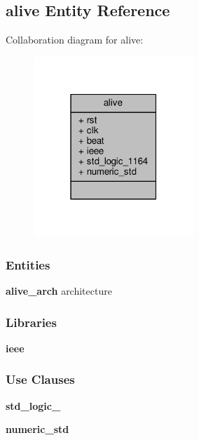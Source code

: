 \subsection{alive Entity Reference}
\label{classalive}


Collaboration diagram for alive\+:\nopagebreak
\begin{figure}[H]
\begin{center}
\leavevmode
\includegraphics[width=171pt]{da/d4e/classalive__coll__graph}
\end{center}
\end{figure}
\subsubsection*{Entities}
\begin{DoxyCompactItemize}
\item 
{\bf alive\+\_\+arch} architecture
\end{DoxyCompactItemize}
\subsubsection*{Libraries}
 \begin{DoxyCompactItemize}
\item 
{\bf ieee} 
\end{DoxyCompactItemize}
\subsubsection*{Use Clauses}
 \begin{DoxyCompactItemize}
\item 
{\bf std\+\_\+logic\+\_}   
\item 
{\bf numeric\+\_\+std}   
\end{DoxyCompactItemize}
